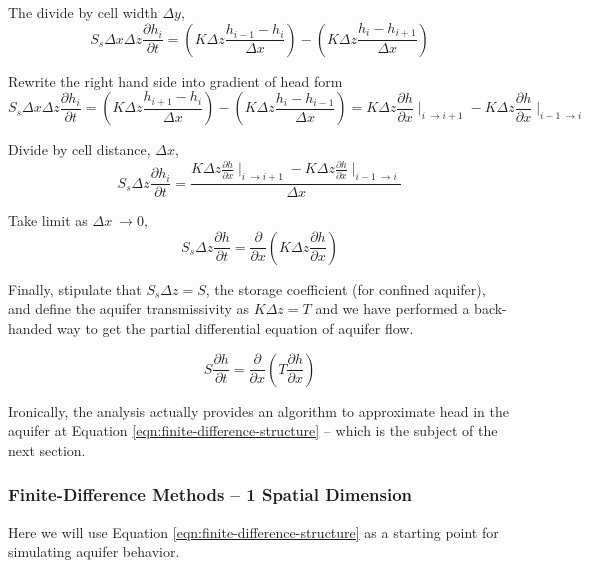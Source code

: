 The divide by cell width $\Delta y $,
 \begin{equation}
S_{s} \Delta x \Delta z \frac{\partial h_i}{\partial t} = 
(K  \Delta z \frac{h_{i-1} - h_{i}}{\Delta x}) - 
(K  \Delta z \frac{h_{i} - h_{i+1}}{\Delta x})
\end{equation}

Rewrite the right hand side into gradient of head form
 \begin{equation}
S_{s} \Delta x \Delta z \frac{\partial h_i}{\partial t} = 
(K \Delta z \frac{h_{i+1} - h_{i}}{\Delta x}) - 
(K \Delta z \frac{h_{i} - h_{i-1}}{\Delta x})
= 
{K \Delta z \frac{\partial h}{\partial x}}\mid_{i~\rightarrow i+1} -
{K \Delta z \frac{\partial h}{\partial x}}\mid_{i-1~\rightarrow i}
\end{equation}

Divide by cell distance, $\Delta x$,
 \begin{equation}
S_{s}  \Delta z \frac{\partial h_i}{\partial t} = 
\frac{{K \Delta z \frac{\partial h}{\partial x}}\mid_{i~\rightarrow i+1} -
{K \Delta z\frac{\partial h}{\partial x}}\mid_{i-1~\rightarrow i}}{\Delta x}
\end{equation}

Take limit as $\Delta x~\rightarrow0$, 
\begin{equation}
S_{s} \Delta z  \frac{\partial h}{\partial t} = 
\frac{\partial}{\partial x}({K \Delta z \frac{\partial h}{\partial x}})
\end{equation}

Finally, stipulate that $S_{s} \Delta z = S$, the storage coefficient (for confined aquifer), and define the aquifer transmissivity as $K \Delta z = T$ and we have performed a back-handed way to get the partial differential equation of aquifer flow.  

\begin{equation}
S \frac{\partial h}{\partial t} = 
\frac{\partial}{\partial x}({T \frac{\partial h}{\partial x}})
\end{equation}

Ironically, the analysis actually provides an algorithm to approximate head in the aquifer at Equation \ref{eqn:finite-difference-structure} -- which is the subject of the next section.

\subsubsection{Finite-Difference Methods -- 1 Spatial Dimension}
Here we will use Equation \ref{eqn:finite-difference-structure} as a starting point for simulating aquifer behavior.   

